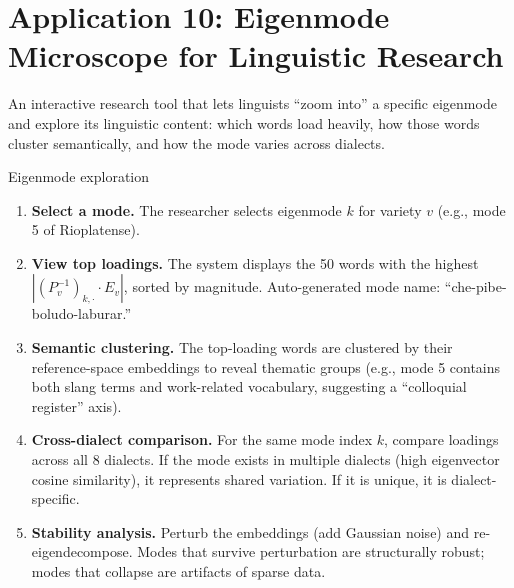 \documentclass[11pt,a4paper]{article}
\begin{document}
\section{Application 10: Eigenmode Microscope for Linguistic Research}
\label{sec:app-microscope}

\begin{appbox}
An interactive research tool that lets linguists ``zoom into'' a
specific eigenmode and explore its linguistic content: which words
load heavily, how those words cluster semantically, and how the mode
varies across dialects.
\end{appbox}

\begin{howbox}{Eigenmode exploration}
\begin{enumerate}[nosep]
  \item \textbf{Select a mode.} The researcher selects eigenmode $k$
    for variety $v$ (e.g., mode 5 of Rioplatense).

  \item \textbf{View top loadings.} The system displays the 50 words
    with the highest $|(P_v^{-1})_{k,\cdot} \cdot E_v|$, sorted by
    magnitude. Auto-generated mode name: ``che-pibe-boludo-laburar.''

  \item \textbf{Semantic clustering.} The top-loading words are
    clustered by their reference-space embeddings to reveal thematic
    groups (e.g., mode 5 contains both slang terms and
    work-related vocabulary, suggesting a ``colloquial
    register'' axis).

  \item \textbf{Cross-dialect comparison.} For the same mode index
    $k$, compare loadings across all 8 dialects. If the mode exists
    in multiple dialects (high eigenvector cosine similarity), it
    represents shared variation. If it is unique, it is
    dialect-specific.

  \item \textbf{Stability analysis.} Perturb the embeddings (add
    Gaussian noise) and re-eigendecompose. Modes that survive
    perturbation are structurally robust; modes that collapse are
    artifacts of sparse data.
\end{enumerate}
\end{howbox}

\end{document}
